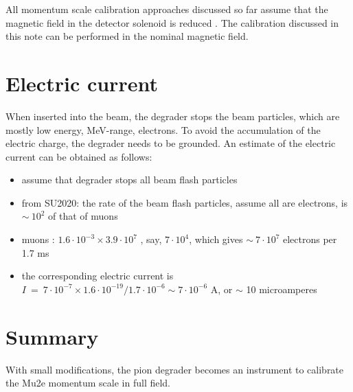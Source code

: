 \documentclass[12pt]{article}
\begin{document}
All momentum scale calibration approaches discussed so far assume that the magnetic field
in the detector solenoid is reduced \cite{MU2E_48630_PIPLUSENU}.
The calibration discussed in this note can be performed in the nominal magnetic field.








\section{Electric current}
When inserted into the beam, the degrader stops the beam particles, which are
mostly low energy, MeV-range, electrons. To avoid the accumulation of the electric charge,
the degrader needs to be grounded. An estimate of the electric current can be obtained
as follows:
\begin{itemize}
\item
  assume that degrader stops all beam flash particles
\item
  from SU2020: the rate of the beam flash particles, assume all are electrons, is $\sim ~ 10^2$ of that of muons
\item
  muons : $1.6 \cdot 10^{-3} \times 3.9 \cdot 10^7$ , say, $7 \cdot 10^4$, which gives $\sim ~ 7 \cdot 10^7$ electrons per 1.7 ms
\item
  the corresponding electric current is $I ~=~ 7 \cdot 10^{-7} \times 1.6 \cdot 10^{-19} / {1.7 \cdot 10^{-6}} \sim 7 \cdot 10^{-6}$ A,
  or $\sim$ 10 microamperes
\end{itemize}



\section {Summary}

With small modifications, the pion degrader becomes an instrument to calibrate the Mu2e
momentum scale in full field.


%
\newpage



% 

\end{document}
